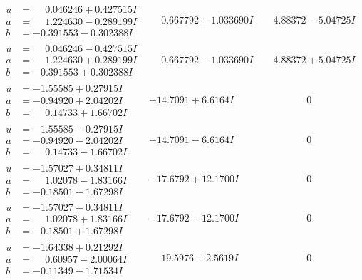 \documentclass[1p]{elsarticle_modified}
\theoremstyle{definition}
\begin{document}
$$\begin{array}{c|c|c}
\begin{aligned}
u &= \phantom{-}0.046246 + 0.427515 I \\
a &= \phantom{-}1.224630 - 0.289199 I \\
b &= -0.391553 - 0.302388 I\end{aligned}
 & \phantom{-}0.667792 + 1.033690 I & \phantom{-}4.88372 - 5.04725 I \\ \hline\begin{aligned}
u &= \phantom{-}0.046246 - 0.427515 I \\
a &= \phantom{-}1.224630 + 0.289199 I \\
b &= -0.391553 + 0.302388 I\end{aligned}
 & \phantom{-}0.667792 - 1.033690 I & \phantom{-}4.88372 + 5.04725 I \\ \hline\begin{aligned}
u &= -1.55585 + 0.27915 I \\
a &= -0.94920 + 2.04202 I \\
b &= \phantom{-}0.14733 + 1.66702 I\end{aligned}
 & -14.7091 + 6.6164 I & \phantom{-0.000000 } 0 \\ \hline\begin{aligned}
u &= -1.55585 - 0.27915 I \\
a &= -0.94920 - 2.04202 I \\
b &= \phantom{-}0.14733 - 1.66702 I\end{aligned}
 & -14.7091 - 6.6164 I & \phantom{-0.000000 } 0 \\ \hline\begin{aligned}
u &= -1.57027 + 0.34811 I \\
a &= \phantom{-}1.02078 - 1.83166 I \\
b &= -0.18501 - 1.67298 I\end{aligned}
 & -17.6792 + 12.1700 I & \phantom{-0.000000 } 0 \\ \hline\begin{aligned}
u &= -1.57027 - 0.34811 I \\
a &= \phantom{-}1.02078 + 1.83166 I \\
b &= -0.18501 + 1.67298 I\end{aligned}
 & -17.6792 - 12.1700 I & \phantom{-0.000000 } 0 \\ \hline\begin{aligned}
u &= -1.64338 + 0.21292 I \\
a &= \phantom{-}0.60957 - 2.00064 I \\
b &= -0.11349 - 1.71534 I\end{aligned}
 & \phantom{-}19.5976 + 2.5619 I & \phantom{-0.000000 } 0 \\ \hline\begin{aligned}

\end{aligned}
\end{array}$$
\end{document}
